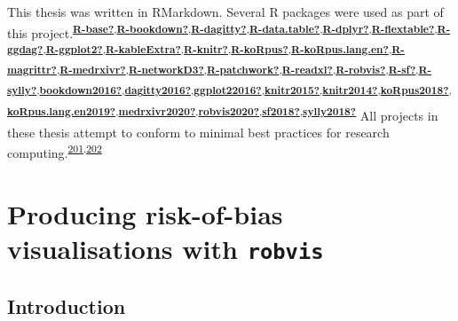 \documentclass[a4paper, twoside]{templates/ociamthesis}
\begin{document}
This thesis was written in RMarkdown. Several R packages were used as part of this project.\textsuperscript{\protect\hyperlink{ref-R-base}{\textbf{R-base?}},\protect\hyperlink{ref-R-bookdown}{\textbf{R-bookdown?}},\protect\hyperlink{ref-R-dagitty}{\textbf{R-dagitty?}},\protect\hyperlink{ref-R-data.table}{\textbf{R-data.table?}},\protect\hyperlink{ref-R-dplyr}{\textbf{R-dplyr?}},\protect\hyperlink{ref-R-flextable}{\textbf{R-flextable?}},\protect\hyperlink{ref-R-ggdag}{\textbf{R-ggdag?}},\protect\hyperlink{ref-R-ggplot2}{\textbf{R-ggplot2?}},\protect\hyperlink{ref-R-kableExtra}{\textbf{R-kableExtra?}},\protect\hyperlink{ref-R-knitr}{\textbf{R-knitr?}},\protect\hyperlink{ref-R-koRpus}{\textbf{R-koRpus?}},\protect\hyperlink{ref-R-koRpus.lang.en}{\textbf{R-koRpus.lang.en?}},\protect\hyperlink{ref-R-magrittr}{\textbf{R-magrittr?}},\protect\hyperlink{ref-R-medrxivr}{\textbf{R-medrxivr?}},\protect\hyperlink{ref-R-networkD3}{\textbf{R-networkD3?}},\protect\hyperlink{ref-R-patchwork}{\textbf{R-patchwork?}},\protect\hyperlink{ref-R-readxl}{\textbf{R-readxl?}},\protect\hyperlink{ref-R-robvis}{\textbf{R-robvis?}},\protect\hyperlink{ref-R-sf}{\textbf{R-sf?}},\protect\hyperlink{ref-R-sylly}{\textbf{R-sylly?}},\protect\hyperlink{ref-bookdown2016}{\textbf{bookdown2016?}},\protect\hyperlink{ref-dagitty2016}{\textbf{dagitty2016?}},\protect\hyperlink{ref-ggplot22016}{\textbf{ggplot22016?}},\protect\hyperlink{ref-knitr2015}{\textbf{knitr2015?}},\protect\hyperlink{ref-knitr2014}{\textbf{knitr2014?}},\protect\hyperlink{ref-koRpus2018}{\textbf{koRpus2018?}},\protect\hyperlink{ref-koRpus.lang.en2019}{\textbf{koRpus.lang.en2019?}},\protect\hyperlink{ref-medrxivr2020}{\textbf{medrxivr2020?}},\protect\hyperlink{ref-robvis2020}{\textbf{robvis2020?}},\protect\hyperlink{ref-sf2018}{\textbf{sf2018?}},\protect\hyperlink{ref-sylly2018}{\textbf{sylly2018?}}}
All projects in these thesis attempt to conform to minimal best practices for research computing.\textsuperscript{\protect\hyperlink{ref-wilson2014}{201},\protect\hyperlink{ref-wilson2017}{202}}

\hypertarget{appendix-robvis}{%
\section{\texorpdfstring{Producing risk-of-bias visualisations with \texttt{robvis}}{Producing risk-of-bias visualisations with robvis}}\label{appendix-robvis}}

\hypertarget{introduction-3}{%
\subsection{Introduction}\label{introduction-3}}
\end{document}
